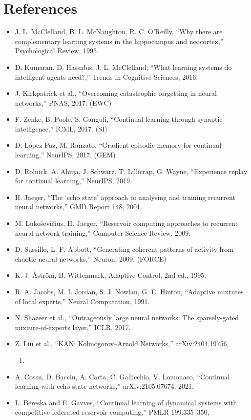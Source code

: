 \documentclass[11pt]{article}
\providecommand{\tightlist}{\setlength{\itemsep}{0pt}%
  \setlength{\parskip}{0pt}}
\begin{document}
\section*{References}\label{references-verified}

\begin{itemize}
\tightlist
\item
  J. L. McClelland, B. L. McNaughton, R. C. O'Reilly, ``Why there are
  complementary learning systems in the hippocampus and neocortex,''
  Psychological Review, 1995.
\item
  D. Kumaran, D. Hassabis, J. L. McClelland, ``What learning systems do
  intelligent agents need?,'' Trends in Cognitive Sciences, 2016.
\item
  J. Kirkpatrick et al., ``Overcoming catastrophic forgetting in neural
  networks,'' PNAS, 2017. (EWC)
\item
  F. Zenke, B. Poole, S. Ganguli, ``Continual learning through synaptic
  intelligence,'' ICML, 2017. (SI)
\item
  D. Lopez-Paz, M. Ranzato, ``Gradient episodic memory for continual
  learning,'' NeurIPS, 2017. (GEM)
\item
  D. Rolnick, A. Ahuja, J. Schwarz, T. Lillicrap, G. Wayne, ``Experience
  replay for continual learning,'' NeurIPS, 2019.
\item
  H. Jaeger, ``The `echo state' approach to analysing and training
  recurrent neural networks,'' GMD Report 148, 2001.
\item
  M. Lukoševičius, H. Jaeger, ``Reservoir computing approaches to
  recurrent neural network training,'' Computer Science Review, 2009.
\item
  D. Sussillo, L. F. Abbott, ``Generating coherent patterns of activity
  from chaotic neural networks,'' Neuron, 2009. (FORCE)
\item
  K. J. Åström, B. Wittenmark, Adaptive Control, 2nd ed., 1995.
\item
  R. A. Jacobs, M. I. Jordan, S. J. Nowlan, G. E. Hinton, ``Adaptive
  mixtures of local experts,'' Neural Computation, 1991.
\item
  N. Shazeer et al., ``Outrageously large neural networks: The
  sparsely-gated mixture-of-experts layer,'' ICLR, 2017.
\item
  Z. Liu et al., ``KAN: Kolmogorov--Arnold Networks,'' arXiv:2404.19756,

  \begin{enumerate}
  \def\labelenumi{\arabic{enumi}.}
  \setcounter{enumi}{2023}
  \tightlist
  \item
  \end{enumerate}
\item
  A. Cossu, D. Bacciu, A. Carta, C. Gallicchio, V. Lomonaco,
  ``Continual learning with echo state networks,''
  arXiv:2105.07674, 2021.
\item
  L. Bereska and E. Gavves, ``Continual learning of dynamical systems
  with competitive federated reservoir computing,'' PMLR 199:335--350,


\end{itemize}
\end{document}
